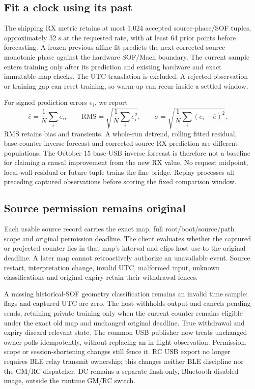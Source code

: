 \documentclass[11pt,letterpaper]{article}
\begin{document}
\subsection{Fit a clock using its past}
The shipping RX metric retains at most 1,024 accepted source-phase/SOF tuples, approximately 32 s at the requested rate, with at least 64 prior points before forecasting. A frozen previous affine fit predicts the next corrected source-monotonic phase against the hardware SOF/Mach boundary. The current sample enters training only after its prediction and existing hardware and exact immutable-map checks. The UTC translation is excluded. A rejected observation or training gap can reset training, so warm-up can recur inside a settled window.

For signed prediction errors $e_i$, we report
\begin{equation}
 \overline e=\frac 1N\sum_i e_i,\qquad
 \mathrm{RMS}=\sqrt{\frac 1N\sum_i e_i^2},\qquad
 \sigma=\sqrt{\frac 1N\sum_i(e_i-\overline e)^2}.
\end{equation}
RMS retains bias and transients. A whole-run detrend, rolling fitted residual, base-counter inverse forecast and corrected-source RX prediction are different populations. The October 15 base-USB inverse forecast is therefore not a baseline for claiming a causal improvement from the new RX value. No request midpoint, local-wall residual or future tuple trains the fine bridge. Replay processes all preceding captured observations before scoring the fixed comparison window.

\subsection{Source permission remains original}
Each usable source record carries the exact map, full root/boot/source/path scope and original permission deadline. The client evaluates whether the captured or projected counter lies in that map's interval and clips host use to the original deadline. A later map cannot retroactively authorize an unavailable event. Source restart, interpretation change, invalid UTC, malformed input, unknown classifications and original expiry retain their withdrawal fences.

A missing historical-SOF geometry classification remains an invalid time sample: flags and captured UTC are zero. The host withholds output and cancels pending sends, retaining private training only when the current counter remains eligible under the exact old map and unchanged original deadline. True withdrawal and expiry discard relevant state. The common USB publisher now treats unchanged owner polls idempotently, without replacing an in-flight observation. Permission, scope or session-shortening changes still fence it. RC USB export no longer requires BLE relay transmit ownership; this changes neither BLE discipline nor the GM/RC dispatcher. DC remains a separate flash-only, Bluetooth-disabled image, outside the runtime GM/RC switch.
\end{document}
